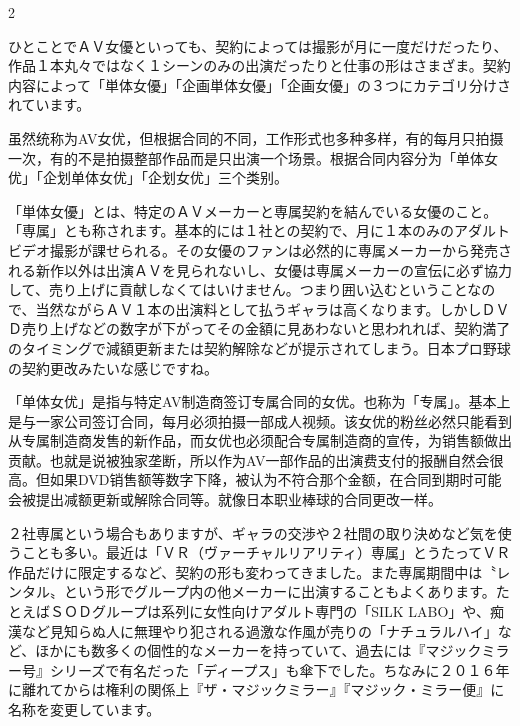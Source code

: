 \documentclass[12pt,UTF8]{ctexbook}
\begin{document}
\begin{paracol}{2}

ひとことでＡＶ女優といっても、契約によっては撮影が月に一度だけだったり、作品１本丸々ではなく１シーンのみの出演だったりと仕事の形はさまざま。契約内容によって「単体女優」「企画単体女優」「企画女優」の３つにカテゴリ分けされています。

\switchcolumn

虽然统称为AV女优，但根据合同的不同，工作形式也多种多样，有的每月只拍摄一次，有的不是拍摄整部作品而是只出演一个场景。根据合同内容分为「单体女优」「企划单体女优」「企划女优」三个类别。

\switchcolumn*

「単体女優」とは、特定のＡＶメーカーと専属契約を結んでいる女優のこと。「専属」とも称されます。基本的には１社との契約で、月に１本のみのアダルトビデオ撮影が課せられる。その女優のファンは必然的に専属メーカーから発売される新作以外は出演ＡＶを見られないし、女優は専属メーカーの宣伝に必ず協力して、売り上げに貢献しなくてはいけません。つまり囲い込むということなので、当然ながらＡＶ１本の出演料として払うギャラは高くなります。しかしＤＶＤ売り上げなどの数字が下がってその金額に見あわないと思われれば、契約満了のタイミングで減額更新または契約解除などが提示されてしまう。日本プロ野球の契約更改みたいな感じですね。

\switchcolumn

「单体女优」是指与特定AV制造商签订专属合同的女优。也称为「专属」。基本上是与一家公司签订合同，每月必须拍摄一部成人视频。该女优的粉丝必然只能看到从专属制造商发售的新作品，而女优也必须配合专属制造商的宣传，为销售额做出贡献。也就是说被独家垄断，所以作为AV一部作品的出演费支付的报酬自然会很高。但如果DVD销售额等数字下降，被认为不符合那个金额，在合同到期时可能会被提出减额更新或解除合同等。就像日本职业棒球的合同更改一样。

\switchcolumn*

２社専属という場合もありますが、ギャラの交渉や２社間の取り決めなど気を使うことも多い。最近は「ＶＲ（ヴァーチャルリアリティ）専属」とうたってＶＲ作品だけに限定するなど、契約の形も変わってきました。また専属期間中は〝レンタル〟という形でグループ内の他メーカーに出演することもよくあります。たとえばＳＯＤグループは系列に女性向けアダルト専門の「SILK LABO」や、痴漢など見知らぬ人に無理やり犯される過激な作風が売りの「ナチュラルハイ」など、ほかにも数多くの個性的なメーカーを持っていて、過去には『マジックミラー号』シリーズで有名だった「ディープス」も傘下でした。ちなみに２０１６年に離れてからは権利の関係上『ザ・マジックミラー』『マジック・ミラー便』に名称を変更しています。


\end{paracol}
\end{document}
